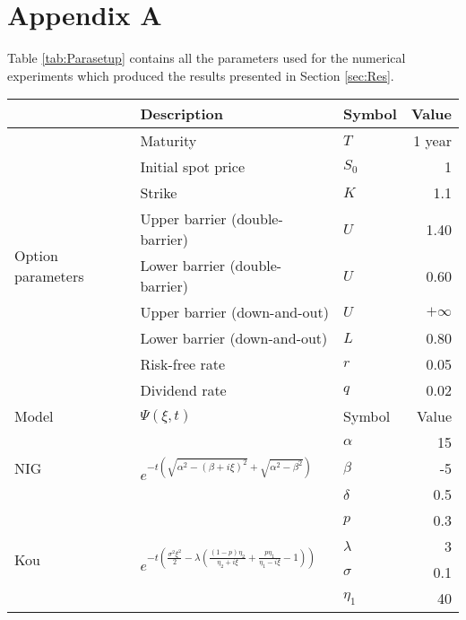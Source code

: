\documentclass[11pt,a4paper]{article}
\begin{document}
\section*{Appendix A}
Table \ref{tab:Parasetup} contains all the parameters used for the numerical experiments which produced the results presented in Section \ref{sec:Res}.
\begin{table}[h]
\begin{center}
\begin{tabular}{lllr}
\hline\hline
& Description & Symbol & Value \\
\hline
\multirow{9}{*}{Option parameters}&Maturity & $T$& 1 year \\
&Initial spot price &$S_0$ & 1\\
&Strike &$K$ & 1.1\\
&Upper barrier (double-barrier) & $U$ & 1.40\\
&Lower barrier (double-barrier) & $U$ & 0.60\\
&Upper barrier (down-and-out) & $U$ & $+\infty$ \\
&Lower barrier (down-and-out) & $L$ & 0.80\\
&Risk-free rate &$r$ & 0.05\\
&Dividend rate &$q$& 0.02\\
\hline
Model & $\Psi(\xi,t)$ & Symbol & Value\\
\hline
\multirow{3}{*}{NIG}&\multirow{3}{*}{$e^{-t\left(\sqrt{\alpha^2-(\beta+i\xi)^2}+\sqrt{\alpha^2-\beta^2}\right)}$} & $\alpha$ & 15\\
& & $\beta$ & -5\\
& & $\delta$ & 0.5\\
\hline
\multirow{5}{*}{Kou}&\multirow{5}{*}{$e^{-t\left(\frac{\sigma^2\xi^2}{2}-\lambda\left(\frac{(1-p)\eta_2}{\eta_2+i\xi}+\frac{p\eta_1}{\eta_1-i\xi}-1\right)\right)}$} & $p$ & 0.3\\
& & $\lambda$ & 3\\
& & $\sigma$ & 0.1\\
& &$\eta_1$ & 40\\

\end{tabular}
\end{center}
\end{table}
\end{document}
